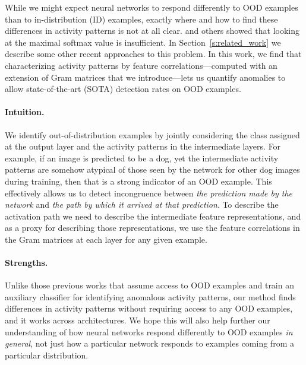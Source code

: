 \documentclass{article}
\begin{document}
While we might expect neural networks to respond differently to OOD examples than to in-distribution (ID) examples, exactly where and how to find these differences in activity patterns is not at all clear. \citet{hendrycks2016baseline} and others \citep{old1,old2} showed that looking at the maximal softmax value is insufficient. In Section~\ref{s:related_work} we describe some other recent approaches to this problem. In this work, we find that characterizing activity patterns by feature correlations---computed with an extension of Gram matrices that we introduce---lets us quantify anomalies to allow state-of-the-art (SOTA) detection rates on OOD examples.


\paragraph{Intuition.} We identify out-of-distribution examples by jointly considering the class assigned at the output layer and the activity patterns in the intermediate layers. For example, if an image is predicted to be a dog, yet the intermediate activity patterns are somehow atypical of those seen by the network for other dog images during training, then that is a strong indicator of an OOD example. This effectively allows us to detect incongruence between {\it the prediction made by the network} and {\it the path by which it arrived at that prediction}. To describe the activation path we need to describe the intermediate feature representations, and as a proxy for describing those representations, we use the feature correlations in the Gram matrices at each layer for any given example.

\paragraph{Strengths.} Unlike those previous works that assume access to OOD examples and train an auxiliary classifier for identifying anomalous activity patterns, our method finds differences in activity patterns without requiring access to any OOD examples, and it works across architectures. We hope this will also help further our understanding of how neural networks respond differently to OOD examples {\it in general}, not just how a particular network responds to examples coming from a particular distribution.
\end{document}
